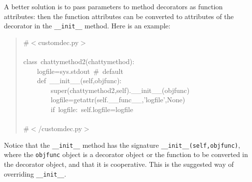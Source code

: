 \documentclass[11pt,english]{article}
\begin{document}
A better solution is to pass  
parameters to method decorators as function attributes: then the function
attributes can be converted to attributes of the decorator 
in  the \texttt{{\_}{\_}init{\_}{\_}} method. Here is an example:
\begin{quote}
\begin{ttfamily}\begin{flushleft}
\mbox{{\#}{$<$}customdec.py{$>$}}\\
\mbox{}\\
\mbox{class~chattymethod2(chattymethod):~}\\
\mbox{~~~~logfile=sys.stdout~{\#}~default}\\
\mbox{~~~~def~{\_}{\_}init{\_}{\_}(self,objfunc):}\\
\mbox{~~~~~~~~super(chattymethod2,self).{\_}{\_}init{\_}{\_}(objfunc)}\\
\mbox{~~~~~~~~logfile=getattr(self.{\_}{\_}func{\_}{\_},'logfile',None)}\\
\mbox{~~~~~~~~if~logfile:~self.logfile=logfile~}\\
\mbox{}\\
\mbox{{\#}{$<$}/customdec.py{$>$}}
\end{flushleft}\end{ttfamily}
\end{quote}

Notice that the \texttt{{\_}{\_}init{\_}{\_}} method has the signature
\texttt{{\_}{\_}init{\_}{\_}(self,objfunc)}, where the \texttt{objfunc} object is a
decorator object or the function to be converted in the decorator 
object, and that it is cooperative.
This is the suggested way of overriding \texttt{{\_}{\_}init{\_}{\_}}.
\end{document}
